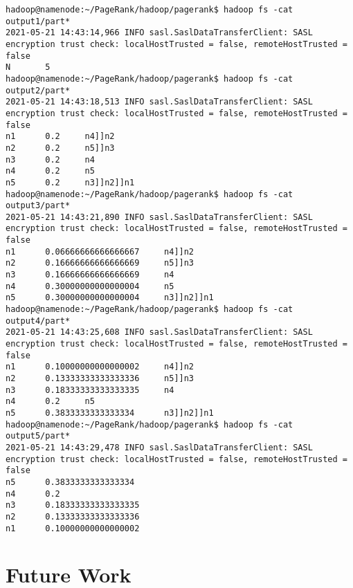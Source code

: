 \documentclass[11pt,a4paper]{article}
\begin{document}
\begin{lstlisting}[]
hadoop@namenode:~/PageRank/hadoop/pagerank$ hadoop fs -cat output1/part*
2021-05-21 14:43:14,966 INFO sasl.SaslDataTransferClient: SASL encryption trust check: localHostTrusted = false, remoteHostTrusted = false
N       5
hadoop@namenode:~/PageRank/hadoop/pagerank$ hadoop fs -cat output2/part*
2021-05-21 14:43:18,513 INFO sasl.SaslDataTransferClient: SASL encryption trust check: localHostTrusted = false, remoteHostTrusted = false
n1      0.2     n4]]n2
n2      0.2     n5]]n3
n3      0.2     n4
n4      0.2     n5
n5      0.2     n3]]n2]]n1
hadoop@namenode:~/PageRank/hadoop/pagerank$ hadoop fs -cat output3/part*
2021-05-21 14:43:21,890 INFO sasl.SaslDataTransferClient: SASL encryption trust check: localHostTrusted = false, remoteHostTrusted = false
n1      0.06666666666666667     n4]]n2
n2      0.16666666666666669     n5]]n3
n3      0.16666666666666669     n4
n4      0.30000000000000004     n5
n5      0.30000000000000004     n3]]n2]]n1
hadoop@namenode:~/PageRank/hadoop/pagerank$ hadoop fs -cat output4/part*
2021-05-21 14:43:25,608 INFO sasl.SaslDataTransferClient: SASL encryption trust check: localHostTrusted = false, remoteHostTrusted = false
n1      0.10000000000000002     n4]]n2
n2      0.13333333333333336     n5]]n3
n3      0.18333333333333335     n4
n4      0.2     n5
n5      0.3833333333333334      n3]]n2]]n1
hadoop@namenode:~/PageRank/hadoop/pagerank$ hadoop fs -cat output5/part*
2021-05-21 14:43:29,478 INFO sasl.SaslDataTransferClient: SASL encryption trust check: localHostTrusted = false, remoteHostTrusted = false
n5      0.3833333333333334
n4      0.2
n3      0.18333333333333335
n2      0.13333333333333336
n1      0.10000000000000002
\end{lstlisting}
\section{Future Work}
\end{document}
